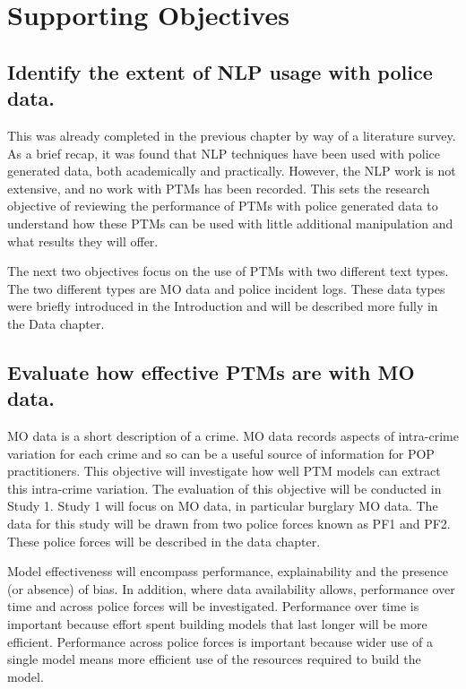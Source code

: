 \section{Supporting Objectives} 

\subsection{Identify the extent of NLP usage with police data.}  This was already completed in the previous chapter by way of a literature survey. As a brief recap, it was found that NLP techniques have been used with police generated data, both academically and practically. However, the NLP work is not extensive, and no work with PTMs has been recorded. This sets the research objective of reviewing the performance of PTMs with police generated data to understand how these PTMs can be used with little additional manipulation and what results they will offer.

The next two objectives focus on the use of PTMs with two different text types. The two different types are MO data and police incident logs. These data types were briefly introduced in the Introduction and will be described more fully in the Data chapter.


\subsection{Evaluate how effective PTMs are with MO data.} MO data is a short description of a crime. MO data records aspects of intra-crime variation for each crime and so can be a useful source of information for POP practitioners. This objective will investigate how well PTM models can extract this intra-crime variation. The evaluation of this objective will be conducted in Study 1. Study 1 will focus on MO data, in particular burglary MO data. The data for this study will be drawn from two police forces known as PF1 and PF2. These police forces will be described in the data chapter.

 Model effectiveness will encompass performance, explainability and the presence (or absence) of bias. In addition, where data availability allows, performance over time and across police forces will be investigated. Performance over time is important because effort spent building models that last longer will be more efficient. Performance across police forces is important because wider use of a single model means more efficient use of the resources required to build the model.

